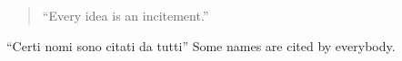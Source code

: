 \begin{table}
\begin{quotation}
``Every idea is an incitement.''
\begin{quotation}
\caption[Justice Holmes]{\noindent\lawcitesinlinerr(Holmes J, in)()[]{gitlowus}{gitlowsc}}
\label{tab:holmes}
\end{quotation}
\end{quotation} 
\end{table}







\noindent ``Certi nomi sono citati da tutti'' Some names are cited by everybody.
\bigskip



